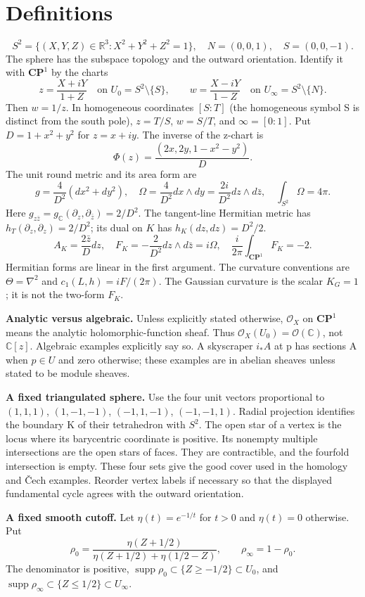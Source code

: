 \documentclass[11pt]{article}
\newcommand{\R}{\mathbb R}
\newcommand{\C}{\mathbb C}
\newcommand{\supp}{\operatorname{supp}}
\newcommand{\CP}{\mathbf{CP}}
\begin{document}
\newpage
\section*{Definitions}

\[
S^2=\{(X,Y,Z)\in\R^3:X^2+Y^2+Z^2=1\},\quad
N=(0,0,1),\quad S=(0,0,-1).
\]
The sphere has the subspace topology and the outward orientation. Identify it with $\CP^1$ by the charts
\[
z=\frac{X+iY}{1+Z}\quad\text{on }U_0=S^2\setminus\{S\},\qquad
w=\frac{X-iY}{1-Z}\quad\text{on }U_\infty=S^2\setminus\{N\}.
\]
Then $w=1/z$. In homogeneous coordinates $[S:T]$ (the homogeneous symbol S is distinct from the south pole), $z=T/S$, $w=S/T$, and $\infty=[0:1]$.
Put $D=1+x^2+y^2$ for $z=x+iy$. The inverse of the z-chart is
\[
\Phi(z)=\frac{(2x,2y,1-x^2-y^2)}{D}.
\]
The unit round metric and its area form are
\[
g=\frac4{D^2}(dx^2+dy^2),\quad
\Omega=\frac4{D^2}dx\wedge dy=\frac{2i}{D^2}dz\wedge d\bar z,
\quad\int_{S^2}\Omega=4\pi.
\]
Here $g_{z\bar z}=g_{\C}(\partial_z,\partial_{\bar z})=2/D^2$.
The tangent-line Hermitian metric has $h_T(\partial_z,\partial_z)=2/D^2$; its dual on $K$ has $h_K(dz,dz)=D^2/2$.
\[
A_K=\frac{2\bar z}{D}dz,\quad F_K=-\frac2{D^2}dz\wedge d\bar z=i\Omega,
\quad \frac{i}{2\pi}\int_{\CP^1}F_K=-2.
\]
Hermitian forms are linear in the first argument. The curvature conventions are $\Theta=\nabla^2$ and $c_1(L,h)=iF/(2\pi)$. The Gaussian curvature is the scalar $K_G=1$; it is not the two-form $F_K$.

\textbf{Analytic versus algebraic.} Unless explicitly stated otherwise, $\mathcal O_X$ on $\CP^1$ means the analytic holomorphic-function sheaf. Thus $\mathcal O_X(U_0)=\mathcal O(\C)$, not $\C[z]$. Algebraic examples explicitly say so. A skyscraper $i_*A$ at p has sections A when $p\in U$ and zero otherwise; these examples are in abelian sheaves unless stated to be module sheaves.

\textbf{A fixed triangulated sphere.} Use the four unit vectors proportional to $(1,1,1)$, $(1,-1,-1)$, $(-1,1,-1)$, $(-1,-1,1)$. Radial projection identifies the boundary K of their tetrahedron with $S^2$. The open star of a vertex is the locus where its barycentric coordinate is positive. Its nonempty multiple intersections are the open stars of faces. They are contractible, and the fourfold intersection is empty. These four sets give the good cover used in the homology and \v{C}ech examples. Reorder vertex labels if necessary so that the displayed fundamental cycle agrees with the outward orientation.

\textbf{A fixed smooth cutoff.} Let $\eta(t)=e^{-1/t}$ for $t>0$ and $\eta(t)=0$ otherwise. Put
\[
\rho_0=\frac{\eta(Z+1/2)}{\eta(Z+1/2)+\eta(1/2-Z)},\qquad
\rho_\infty=1-\rho_0.
\]
The denominator is positive, $\supp\rho_0\subset\{Z\ge-1/2\}\subset U_0$, and $\supp\rho_\infty\subset\{Z\le1/2\}\subset U_\infty$.
\end{document}
